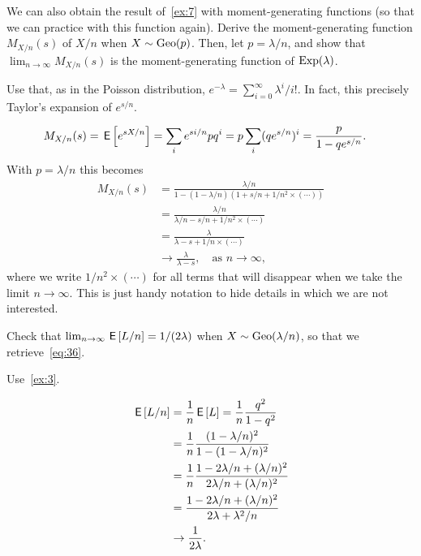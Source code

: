 \documentclass[a4paper,12pt]{article}
\begin{document}
\begin{exercise}
We can also obtain the result of~\cref{ex:7} with moment-generating functions (so that we can practice with this function again).
Derive the moment-generating function $M_{X/n}(s)$ of $X/n$ when $X\sim \mathrm{Geo}(p)$. Then, let $p = \lambda/n$, and show that  $\lim_{n\to\infty}M_{X/n}(s)$ is the moment-generating function of $\mathrm{Exp}(\lambda)$.
\begin{hint}
  Use that, as in the Poisson distribution, $e^{-\lambda} = \sum_{i=0}^{\infty}\lambda^{i}/i!$.
  In fact, this precisely Taylor's expansion of $e^{s/n}$.
\end{hint}
\begin{solution}
  \begin{align}
    \label{eq:20}
M_{X/n}(s) 
&= \,\mathsf{E}\left[e^{s X/n}\right] = \sum_{i} e^{s i/n} p q^{i} = p\sum_{i} (qe^{s/n})^{i} = \frac{p}{1-qe^{s/n}}.
  \end{align}
With $p=\lambda/n$ this becomes
  \begin{align}
M_{X/n}(s) 
&= \frac{\lambda/n}{1-(1-\lambda/n) (1+s/n + 1/n^{2}\times(\cdots))} \\
&= \frac{\lambda/n}{\lambda/n - s/n + 1/n^{2}\times (\cdots)} \\
&= \frac{\lambda}{\lambda - s + 1/n\times(\cdots)} \\
&\to \frac{\lambda}{\lambda - s}, \quad\text{as }  n\to \infty,
  \end{align}
  where we write $1/n^{2}\times(\cdots)$ for all terms that will disappear when we take the limit $n\to \infty$.
  This is just handy notation to hide details in which we are not interested.
\end{solution}
\end{exercise}

\begin{exercise}\label{ex:11}
Check that $\lim_{n\to\infty}\,\mathsf{E}\left[L/n\right] = 1/(2\lambda)$ when $X\sim \mathrm{Geo}(\lambda/n)$, so that we retrieve~\cref{eq:36}.
\begin{hint}
  Use~\cref{ex:3}.
\end{hint}
\begin{solution}
  \begin{align}
    \label{eq:21}
\,\mathsf{E}\left[L/n\right]  &= \frac 1 n \,\mathsf{E}\left[L\right] = \frac 1 n \frac{q^2}{1-q^{2}} \\
 &= \frac 1 n \frac{(1-\lambda/n)^2}{1-(1-\lambda/n)^{2}} \\
 &= \frac 1 n \frac{1-2 \lambda/n + (\lambda/n)^2}{2 \lambda /n + (\lambda/n)^{2}} \\
 &= \frac{1-2 \lambda/n + (\lambda/n)^2}{2 \lambda + \lambda^{2}/n} \\
&\to \frac 1{2\lambda}.
  \end{align}
\end{solution}
\end{exercise}
\end{document}
